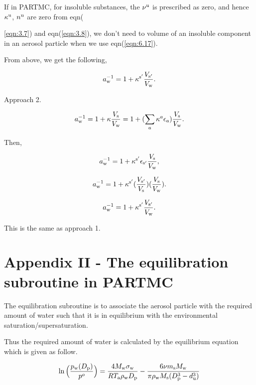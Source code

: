 \documentclass[12pt]{article}
\begin{document}
If in PARTMC, for insoluble substances, the $\nu^{\rm u}$ is prescribed as zero, and hence $\kappa^{\rm u}$, $n^{\rm u}$  are zero from eqn({\ref{eqn:3.7}) and eqn(\ref{eqn:3.8}), we don't need to volume of an insoluble component in an aerosol particle when we use eqn(\ref{eqn:6.17}).

From above, we get the following,

\begin{equation}\label{eqn:A6}
a_{\rm w}^{-1}=1+ \kappa^{\rm s'} \frac{V_{\rm s'}}{V_{\rm w}}.
\end{equation}

Approach 2.

\begin{equation}\label{eqn:A7}
a_{\rm w}^{-1}=1+\kappa \frac{V_{\rm s}}{V_{\rm w}}=1+ (\sum_{a} \kappa^{a} \epsilon_{a})\frac{V_{\rm s}}{V_{\rm w}}.
\end{equation}

Then,

\begin{equation}\label{eqn:A8}
a_{\rm w}^{-1}=1+ \kappa^{\rm s'} \epsilon_{\rm s'} \frac{V_{\rm s}}{V_{\rm w}},
\end{equation}

\begin{equation}\label{eqn:A9}
a_{\rm w}^{-1}=1+ \kappa^{\rm s'} (\frac{V_{\rm s'}}{V_{\rm s}})(\frac{V_{\rm s}}{V_{\rm w}}).
\end{equation}

\begin{equation}\label{eqn:A10}
a_{\rm w}^{-1}=1+ \kappa^{\rm s'} \frac{V_{\rm s'}}{V_{\rm w}}.
\end{equation}

This is the same as approach 1. 


\section{Appendix II - The equilibration subroutine in PARTMC}

The equilibration subroutine is to associate the aerosol particle with the required amount of water such that it is in equilibrium with the environmental saturation/supersaturation.

Thus the required amount of water is calculated by the equilibrium equation which is given as follow.

\begin{equation}\label{eqn:A11}
\ln{\Big(\frac{p_{\rm w}(D_{\rm p})}{p^{o}}\Big)}=\frac{4 M_{\rm w} \sigma_{\rm w}}{R T_{\rm a} \rho_{\rm w} D_{\rm p}}-\frac{6 \nu m_{\rm s} M_{\rm w}}{\pi \rho_{\rm w} M_{\rm s}(D_{\rm p}^{3}-d_{\rm u}^{3})}
\end{equation}

}
\end{document}
